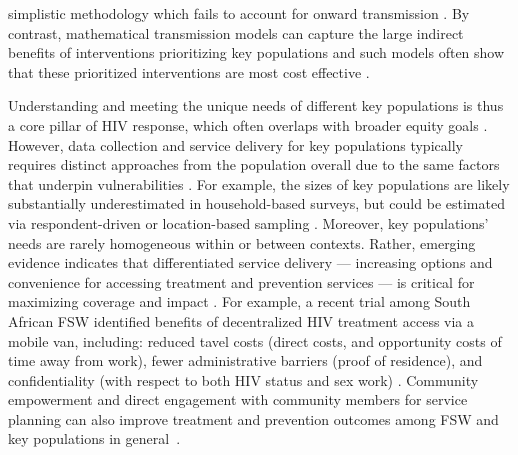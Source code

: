 simplistic methodology which fails to account for onward transmission \cite{Mishra2014mot}.
By contrast, mathematical transmission models can capture the large indirect benefits of
interventions prioritizing key populations \cite{Mishra2014mot,Long2021}
and such models often show that these prioritized interventions are most cost effective
\cite{Stuart2018,Maheu-Giroux2019,Johnson2019}.
\par
Understanding and meeting the unique needs of different key populations is thus
a core pillar of HIV response, which often overlaps with broader equity goals
\cite{Shannon2015,Beyrer2015,Beyrer2016}.
However, data collection and service delivery for key populations typically requires
distinct approaches from the population overall
due to the same factors that underpin vulnerabilities \cite{UNAIDS2010kps,WHO2016kp}.
For example, the sizes of key populations
are likely substantially underestimated in household-based surveys,
but could be estimated via respondent-driven or location-based sampling
\cite{UNAIDS2010kps,Lowndes2012,Abdul-Quader2014}.
Moreover, key populations' needs are rarely homogeneous within or between contexts.
Rather, emerging evidence indicates that differentiated service delivery
--- \ie increasing options and convenience for accessing treatment and prevention services ---
is critical for maximizing coverage and impact \cite{Grimsrud2016,Ehrenkranz2019,Huber2021}.
For example, a recent trial among South African FSW identified benefits of
decentralized HIV treatment access via a mobile van, including:
reduced tavel costs (direct costs, and opportunity costs of time away from work),
fewer administrative barriers (\eg proof of residence), and
confidentiality (with respect to both HIV status and sex work) \cite{Comins2022}.
Community empowerment and direct engagement with community members for service planning
can also improve treatment and prevention outcomes
among FSW and key populations in general~\cite{Atuhaire2021}.
